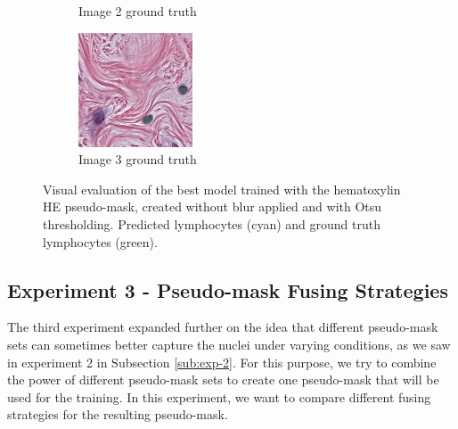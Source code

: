 \begin{figure}[H]
\begin{subfigure}[b]{0.32\textwidth}
    \caption{Image 2 ground truth}
  \end{subfigure}\hfill
  \begin{subfigure}[b]{0.32\textwidth}
    \centering
    \includegraphics[width=\linewidth]{assets/images/for_presentation/exp2-3-gt.png}
    \caption{Image 3 ground truth}
  \end{subfigure}
  \caption{Visual evaluation of the best model trained with the hematoxylin HE pseudo-mask, created without blur applied and with Otsu thresholding. Predicted lymphocytes (cyan) and ground truth lymphocytes (green).}
  \label{fig:exp2-results}
\end{figure}

\subsection{Experiment 3 - Pseudo-mask Fusing Strategies}
\label{sub:exp-3}
The third experiment expanded further on the idea that different pseudo-mask sets can sometimes better capture the nuclei under varying conditions, as we saw in experiment 2 in Subsection \ref{sub:exp-2}. For this purpose, we try to combine the power of different pseudo-mask sets to create one pseudo-mask that will be used for the training. In this experiment, we want to compare different fusing strategies for the resulting pseudo-mask.

